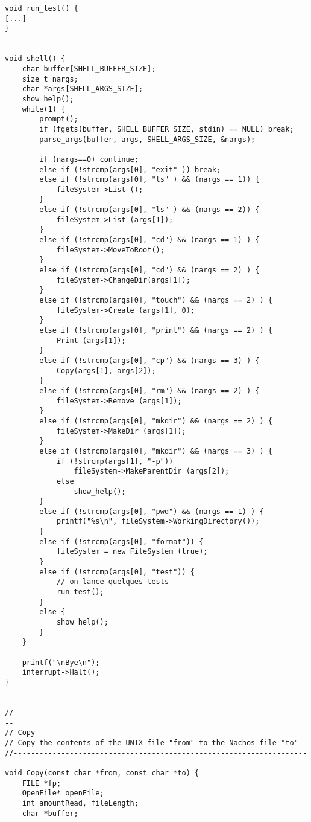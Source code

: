 \documentclass[a4paper,10pt]{article}
\begin{document}
\begin{lstlisting}
void run_test() {
[...]
}


void shell() {
    char buffer[SHELL_BUFFER_SIZE];
    size_t nargs;
    char *args[SHELL_ARGS_SIZE];
    show_help();
    while(1) {
        prompt();
        if (fgets(buffer, SHELL_BUFFER_SIZE, stdin) == NULL) break;
        parse_args(buffer, args, SHELL_ARGS_SIZE, &nargs);

        if (nargs==0) continue;
        else if (!strcmp(args[0], "exit" )) break;
        else if (!strcmp(args[0], "ls" ) && (nargs == 1)) {
            fileSystem->List ();
        }
        else if (!strcmp(args[0], "ls" ) && (nargs == 2)) {
            fileSystem->List (args[1]);
        }
        else if (!strcmp(args[0], "cd") && (nargs == 1) ) {
            fileSystem->MoveToRoot();
        }
        else if (!strcmp(args[0], "cd") && (nargs == 2) ) {
            fileSystem->ChangeDir(args[1]);
        }
        else if (!strcmp(args[0], "touch") && (nargs == 2) ) {
            fileSystem->Create (args[1], 0);
        }
        else if (!strcmp(args[0], "print") && (nargs == 2) ) {
            Print (args[1]);
        }
        else if (!strcmp(args[0], "cp") && (nargs == 3) ) {
            Copy(args[1], args[2]);
        }
        else if (!strcmp(args[0], "rm") && (nargs == 2) ) {
            fileSystem->Remove (args[1]);
        }
        else if (!strcmp(args[0], "mkdir") && (nargs == 2) ) {
            fileSystem->MakeDir (args[1]);
        }
        else if (!strcmp(args[0], "mkdir") && (nargs == 3) ) {
            if (!strcmp(args[1], "-p"))
                fileSystem->MakeParentDir (args[2]);
            else
                show_help();
        }
        else if (!strcmp(args[0], "pwd") && (nargs == 1) ) {
            printf("%s\n", fileSystem->WorkingDirectory());
        }
        else if (!strcmp(args[0], "format")) {
            fileSystem = new FileSystem (true);
        }
        else if (!strcmp(args[0], "test")) {
            // on lance quelques tests
            run_test();
        }
        else {
            show_help();
        }
    }

    printf("\nBye\n");
    interrupt->Halt();
}


//----------------------------------------------------------------------
// Copy
// Copy the contents of the UNIX file "from" to the Nachos file "to"
//----------------------------------------------------------------------
void Copy(const char *from, const char *to) {
    FILE *fp;
    OpenFile* openFile;
    int amountRead, fileLength;
    char *buffer;


\end{lstlisting}
\end{document}
